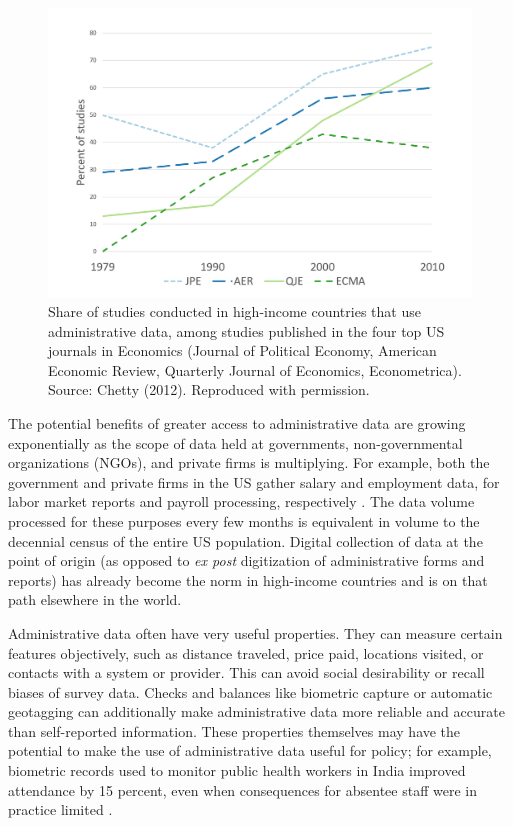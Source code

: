 \begin{figure}
\centering
\includegraphics{./figures/Chetty-graph.png}
\caption{\label{fig:introchetty}Share of studies conducted in high-income countries that use administrative data, among studies published in the four top US journals in Economics (Journal of Political Economy, American Economic Review, Quarterly Journal of Economics, Econometrica). Source: Chetty (2012). Reproduced with permission.}
\end{figure}

The potential benefits of greater access to administrative data are growing exponentially as the scope of data held at governments, non-governmental organizations (NGOs), and private firms is multiplying. For example, both the government and private firms in the US gather salary and employment data, for labor market reports and payroll processing, respectively \citep{abowd_lehd_2009, grigsby2020forthcoming}. The data volume processed for these purposes every few months is equivalent in volume to the decennial census of the entire US population. Digital collection of data at the point of origin (as opposed to \emph{ex post} digitization of administrative forms and reports) has already become the norm in high-income countries and is on that path elsewhere in the world.

Administrative data often have very useful properties. They can measure certain features objectively, such as distance traveled, price paid, locations visited, or contacts with a system or provider. This can avoid social desirability or recall biases of survey data. Checks and balances like biometric capture or automatic geotagging can additionally make administrative data more reliable and accurate than self-reported information. These properties themselves may have the potential to make the use of administrative data useful for policy; for example, biometric records used to monitor public health workers in India improved attendance by 15 percent, even when consequences for absentee staff were in practice limited \citep{dhaliwal2017}.

